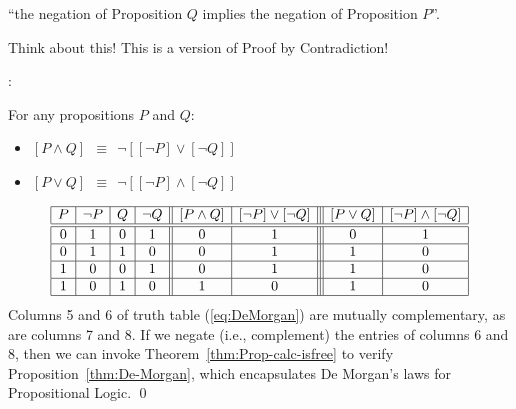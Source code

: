 \hspace*{.25in}
``the negation of Proposition $Q$ implies the negation of Proposition $P$''.

\smallskip

\noindent
Think about this!  This is a version of Proof by Contradiction!

\bigskip

:

\begin{prop}
\label{thm:De-Morgan}
For any propositions $P$ and $Q$:
\begin{itemize}
\item
$[ P \wedge Q ] \ \ \equiv \ \ \neg [ [\neg P] \vee [\neg Q]]$
\medskip\item
$[ P \vee Q ] \ \ \equiv \ \ \neg [ [\neg P] \wedge [\neg Q]]$
\end{itemize}
\end{prop}

\begin{equation}
\label{eq:DeMorgan}
\begin{array}{|c|c|c|c||c|c|||c|c|}
\hline
P & \neg P & Q & \neg Q 
  & [ P \wedge Q ]
  & [\neg P] \vee [\neg Q]
  & [ P \vee Q ]
  & [\neg P] \wedge [\neg Q] \\
\hline
\hline
0 & 1 & 0 & 1
  & 0
  & 1
  & 0
  & 1 \\
\hline
0 & 1 & 1 & 0
  & 0
  & 1
  & 1
  & 0 \\
\hline
1 & 0 & 0 & 1
  & 0
  & 1
  & 1
  & 0 \\
\hline
1 & 0 & 1 & 0
  & 1
  & 0
  & 1
  & 0 \\
\hline
\end{array}
\end{equation}
Columns 5 and 6 of truth table (\ref{eq:DeMorgan}) are mutually complementary, as are columns 7 and 8.  If we negate (i.e., complement) the entries of columns 6 and 8, then we can invoke Theorem~\ref{thm:Prop-calc-isfree} to verify Proposition~\ref{thm:De-Morgan}, which encapsulates De Morgan's laws for Propositional Logic.  \qed

\medskip


\smallskip


